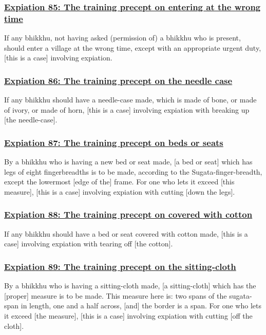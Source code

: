 \subsubsection*{\hyperref[pac85]{Expiation 85: The training precept on entering at the wrong time}}
\label{exp85}
If any bhikkhu, not having asked (permission of) a bhikkhu who is present, should enter a village at the wrong time, except with an appropriate urgent duty, [this is a case] involving expiation.



\subsubsection*{\hyperref[pac86]{Expiation 86: The training precept on the needle case}}
\label{exp86}
If any bhikkhu should have a needle-case made, which is made of bone, or made of ivory, or made of horn, [this is a case] involving expiation with breaking up [the needle-case].



\subsubsection*{\hyperref[pac87]{Expiation 87: The training precept on beds or seats}}
\label{exp87}
By a bhikkhu who is having a new bed or seat made, [a bed or seat] which has legs of eight fingerbreadths is to be made, according to the Sugata-finger-breadth, except the lowermost [edge of the] frame. For one who lets it exceed [this measure], [this is a case] involving expiation with cutting [down the legs].



\subsubsection*{\hyperref[pac88]{Expiation 88: The training precept on covered with cotton}}
\label{exp88}
If any bhikkhu should have a bed or seat covered with cotton made, [this is a case] involving expiation with tearing off [the cotton].



\subsubsection*{\hyperref[pac89]{Expiation 89: The training precept on the sitting-cloth}}
\label{exp89}
By a bhikkhu who is having a sitting-cloth made, [a sitting-cloth] which has the [proper] measure is to be made. This measure here is: two spans of the sugata-span in length, one and a half across, [and] the border is a span. For one who lets it exceed [the measure], [this is a case] involving expiation with cutting [off the cloth].



